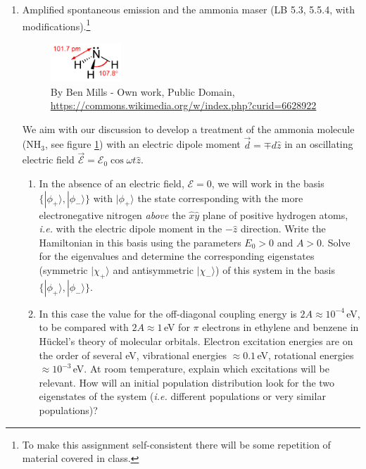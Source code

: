 \documentclass[letterpaper,11pt]{article}
\begin{document}
\begin{enumerate}
\begin{enumerate}
  \end{enumerate}
  \item Amplified spontaneous emission and the ammonia maser (LB 5.3, 5.5.4, with modifications).\footnote{To make this assignment self-consistent there will be some repetition of material covered in class.}
  \begin{figure}
    \begin{center}
      \includegraphics[width=0.25\textwidth]{images/Ammonia-dimensions-2D}
    \end{center}
    \caption{By Ben Mills - Own work, Public Domain, \url{https://commons.wikimedia.org/w/index.php?curid=6628922}}
    \label{fig:ammonia}
  \end{figure}
  We aim with our discussion to develop a treatment of the ammonia molecule (NH$_3$, see figure \ref{fig:ammonia}) with an electric dipole moment $\vec{d} = \mp d \hat{z}$ in an oscillating electric field $\vec{\mathcal{E}} = \mathcal{E}_0 \cos\omega t \hat{z}$.
  \begin{enumerate}
    \item In the absence of an electric field, $\mathcal{E} = 0$, we will work in the basis $\{|\phi_+\rangle, |\phi_-\rangle\}$ with $|\phi_+\rangle$ the state corresponding with the more electronegative nitrogen \emph{above} the $\hat{x}\hat{y}$ plane of positive hydrogen atoms, \textit{i.e.} with the electric dipole moment in the $-\hat{z}$ direction. Write the Hamiltonian in this basis using the parameters $E_0 > 0$ and $A > 0$. Solve for the eigenvalues and determine the corresponding eigenstates (symmetric $|\chi_+\rangle$ and antisymmetric $|\chi_-\rangle$) of this system in the basis $\{|\phi_+\rangle, |\phi_-\rangle\}$.
    \item In this case the value for the off-diagonal coupling energy is $2 A \approx 10^{-4}$\,eV, to be compared with $2 A \approx 1$\,eV for $\pi$ electrons in ethylene and benzene in H\"uckel's theory of molecular orbitals. Electron excitation energies are on the order of several eV, vibrational energies $\approx 0.1$\,eV, rotational energies $\approx 10^{-3}$\,eV. At room temperature, explain which excitations will be relevant. How will an initial population distribution look for the two eigenstates of the system (\textit{i.e.} different populations or very similar populations)?

\end{enumerate}
\end{enumerate}
\end{document}
